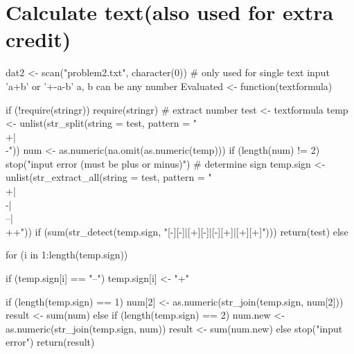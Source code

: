 \documentclass[11pt]{article}\usepackage[]{graphicx}\usepackage[]{color}
\begin{document}
\section{Calculate text(also used for extra credit)}
\begin{Schunk}
\begin{Sinput}
dat2 <- scan("problem2.txt", character(0))
# only used for single text input 'a+b' or '+-a-b' a, b can be any number
Evaluated <- function(textformula) {
    if (!require(stringr)) 
        require(stringr)
    # extract number
    test <- textformula
    temp <- unlist(str_split(string = test, pattern = "\\+|\\-"))
    num <- as.numeric(na.omit(as.numeric(temp)))
    if (length(num) != 2) 
        stop("input error (must be plus or minus)")
    # determine sign
    temp.sign <- unlist(str_extract_all(string = test, pattern = "\\+|\\-|\\--|\\++"))
    if (sum(str_detect(temp.sign, "[-][-]|[+][-]|[-][+]|[+][+]"))) {
        return(test)
    } else {
        for (i in 1:length(temp.sign)) {
            if (temp.sign[i] == "--") 
                temp.sign[i] <- "+"
            
        }
        
        if (length(temp.sign) == 1) {
            num[2] <- as.numeric(str_join(temp.sign, num[2]))
            result <- sum(num)
        } else if (length(temp.sign) == 2) {
            num.new <- as.numeric(str_join(temp.sign, num))
            result <- sum(num.new)
        } else {
            stop("input error")
        }
        return(result)
    }
    
}


\end{Sinput}
\end{Schunk}
\end{document}
